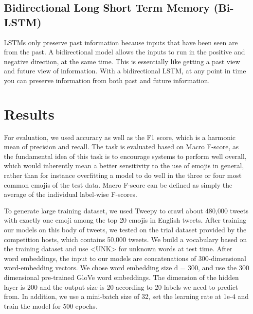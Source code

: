 \documentclass[11pt,a4paper]{article}
\begin{document}
	\subsection{Bidirectional Long Short Term Memory (Bi-LSTM)}
	LSTMs only preserve past information because inputs that have been seen are from the past. A bidirectional model allows the inputs to run in the positive and negative direction, at the same time. This is essentially like getting a past view and future view of information. With a bidirectional LSTM, at any point in time you can preserve information from both past and future information.
	
\section{Results}

For evaluation, we used accuracy as well as the F1 score, which is a harmonic mean of precision and recall. The task is evaluated based on Macro F-score, as the fundamental idea of this task is to encourage systems to perform well overall, which would inherently mean a better sensitivity to the use of emojis in general, rather than for instance overfitting a model to do well in the  three or four most common emojis of the test data. Macro F-score can be defined as simply the average of the individual label-wise F-scores.

\par
To generate large training dataset, we used Tweepy to crawl about 480,000 tweets with exactly one emoji among the top 20 emojis in English tweets. After training our models on this body of tweets, we tested on the trial dataset provided by the competition hosts, which contains 50,000 tweets. We build a vocabulary based on the training dataset and use <UNK> for unknown words at test time. After word embeddings, the input to our models are concatenations of 300-dimensional word-embedding vectors. We chose word embedding size d = 300, and use the 300 dimensional pre-trained GloVe word embeddings. The dimension of the hidden layer is 200 and the output size is 20 according to 20 labels we need to predict from. In addition, we use a mini-batch size of 32, set the learning rate at 1e-4 and train the model for 500 epochs.	
\end{document}
